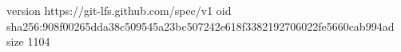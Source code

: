 version https://git-lfs.github.com/spec/v1
oid sha256:908f00265dda38c509545a23bc507242e618f3382192706022fe5660cab994ad
size 1104
